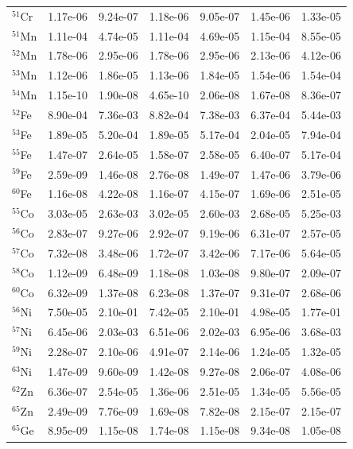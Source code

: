 \begin{table}
\begin{tabular}{l|cc|cc|cc}
$^{51}$Cr & 1.17e-06 & 9.24e-07 & 1.18e-06 & 9.05e-07 & 1.45e-06 & 1.33e-05\\
$^{51}$Mn & 1.11e-04 & 4.74e-05 & 1.11e-04 & 4.69e-05 & 1.15e-04 & 8.55e-05\\
$^{52}$Mn & 1.78e-06 & 2.95e-06 & 1.78e-06 & 2.95e-06 & 2.13e-06 & 4.12e-06\\
$^{53}$Mn & 1.12e-06 & 1.86e-05 & 1.13e-06 & 1.84e-05 & 1.54e-06 & 1.54e-04\\
$^{54}$Mn & 1.15e-10 & 1.90e-08 & 4.65e-10 & 2.06e-08 & 1.67e-08 & 8.36e-07\\
$^{52}$Fe & 8.90e-04 & 7.36e-03 & 8.82e-04 & 7.38e-03 & 6.37e-04 & 5.44e-03\\
$^{53}$Fe & 1.89e-05 & 5.20e-04 & 1.89e-05 & 5.17e-04 & 2.04e-05 & 7.94e-04\\
$^{55}$Fe & 1.47e-07 & 2.64e-05 & 1.58e-07 & 2.58e-05 & 6.40e-07 & 5.17e-04\\
$^{59}$Fe & 2.59e-09 & 1.46e-08 & 2.76e-08 & 1.49e-07 & 1.47e-06 & 3.79e-06\\
$^{60}$Fe & 1.16e-08 & 4.22e-08 & 1.16e-07 & 4.15e-07 & 1.69e-06 & 2.51e-05\\
$^{55}$Co & 3.03e-05 & 2.63e-03 & 3.02e-05 & 2.60e-03 & 2.68e-05 & 5.25e-03\\
$^{56}$Co & 2.83e-07 & 9.27e-06 & 2.92e-07 & 9.19e-06 & 6.31e-07 & 2.57e-05\\
$^{57}$Co & 7.32e-08 & 3.48e-06 & 1.72e-07 & 3.42e-06 & 7.17e-06 & 5.64e-05\\
$^{58}$Co & 1.12e-09 & 6.48e-09 & 1.18e-08 & 1.03e-08 & 9.80e-07 & 2.09e-07\\
$^{60}$Co & 6.32e-09 & 1.37e-08 & 6.23e-08 & 1.37e-07 & 9.31e-07 & 2.68e-06\\
$^{56}$Ni & 7.50e-05 & 2.10e-01 & 7.42e-05 & 2.10e-01 & 4.98e-05 & 1.77e-01\\
$^{57}$Ni & 6.45e-06 & 2.03e-03 & 6.51e-06 & 2.02e-03 & 6.95e-06 & 3.68e-03\\
$^{59}$Ni & 2.28e-07 & 2.10e-06 & 4.91e-07 & 2.14e-06 & 1.24e-05 & 1.32e-05\\
$^{63}$Ni & 1.47e-09 & 9.60e-09 & 1.42e-08 & 9.27e-08 & 2.06e-07 & 4.08e-06\\
$^{62}$Zn & 6.36e-07 & 2.54e-05 & 1.36e-06 & 2.51e-05 & 1.34e-05 & 5.56e-05\\
$^{65}$Zn & 2.49e-09 & 7.76e-09 & 1.69e-08 & 7.82e-08 & 2.15e-07 & 2.15e-07\\
$^{65}$Ge & 8.95e-09 & 1.15e-08 & 1.74e-08 & 1.15e-08 & 9.34e-08 & 1.05e-08\\
\hline
\end{tabular}
\end{table}

